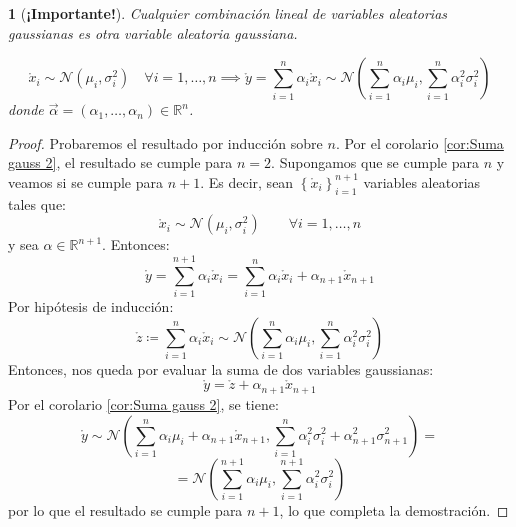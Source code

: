 \documentclass[11pt,a4paper,spanish]{article}
\numberwithin{equation}{section}
\numberwithin{table}{section}
\numberwithin{figure}{section}
\theoremstyle{definition}
\theoremstyle{remark}
\theoremstyle{definition}
\theoremstyle{remark}
\theoremstyle{plain}
\theoremstyle{plain}
\theoremstyle{plain}
\newtheorem{cor}{\protect\corollaryname}[section]
\theoremstyle{plain}
\theoremstyle{plain}
\theoremstyle{plain}
\providecommand{\corollaryname}{Corolario}
\begin{document}
	\begin{cor}[\textbf{¡Importante!}]
		\label{cor:Suma Gauss}Cualquier combinación lineal de variables
		aleatorias gaussianas es otra variable aleatoria gaussiana.
		
		\[
		\mathring{x}_{i}\sim\mathcal{N}\left(\mu_{i},\sigma_{i}^{2}\right)\quad\forall i=1,\dots,n\implies\mathring{y}=\sum_{i=1}^{n}\alpha_{i}\mathring{x}_{i}\sim\mathcal{N}\left(\sum_{i=1}^{n}\alpha_{i}\mu_{i},\sum_{i=1}^{n}\alpha_{i}^{2}\sigma_{i}^{2}\right)
		\]
		donde $\vec{\alpha}=\left(\alpha_{1},\dots,\alpha_{n}\right)\in\mathbb{R}^{n}$.
	\end{cor}
	\begin{proof}
		Probaremos el resultado por inducción sobre $n$. Por el corolario
		\vref{cor:Suma gauss 2}, el resultado se cumple para $n=2$. Supongamos
		que se cumple para $n$ y veamos si se cumple para $n+1$. Es decir,
		sean $\left\{ \mathring{x}_{i}\right\} _{i=1}^{n+1}$ variables aleatorias
		tales que:
		\[
		\mathring{x}_{i}\sim\mathcal{N}\left(\mu_{i},\sigma_{i}^{2}\right)\qquad\forall i=1,\dots,n
		\]
		y sea $\alpha\in\mathbb{R}^{n+1}$. Entonces:
		\[
		\mathring{y}=\sum_{i=1}^{n+1}\alpha_{i}\mathring{x}_{i}=\sum_{i=1}^{n}\alpha_{i}\mathring{x}_{i}+\alpha_{n+1}\mathring{x}_{n+1}
		\]
		Por hipótesis de inducción:
		\[
		\mathring{z}\coloneqq\sum_{i=1}^{n}\alpha_{i}\mathring{x}_{i}\sim\mathcal{N}\left(\sum_{i=1}^{n}\alpha_{i}\mu_{i},\sum_{i=1}^{n}\alpha_{i}^{2}\sigma_{i}^{2}\right)
		\]
		Entonces, nos queda por evaluar la suma de dos variables gaussianas:
		\[
		\mathring{y}=\mathring{z}+\alpha_{n+1}\mathring{x}_{n+1}
		\]
		Por el corolario \vref{cor:Suma gauss 2}, se tiene:
		\[
		\mathring{y}\sim\mathcal{N}\left(\sum_{i=1}^{n}\alpha_{i}\mu_{i}+\alpha_{n+1}\mathring{x}_{n+1},\sum_{i=1}^{n}\alpha_{i}^{2}\sigma_{i}^{2}+\alpha_{n+1}^{2}\sigma_{n+1}^{2}\right)=
		\]
		\[
		=\mathcal{N}\left(\sum_{i=1}^{n+1}\alpha_{i}\mu_{i},\sum_{i=1}^{n+1}\alpha_{i}^{2}\sigma_{i}^{2}\right)
		\]
		por lo que el resultado se cumple para $n+1$, lo que completa la
		demostración.
	\end{proof}
	
\end{document}
